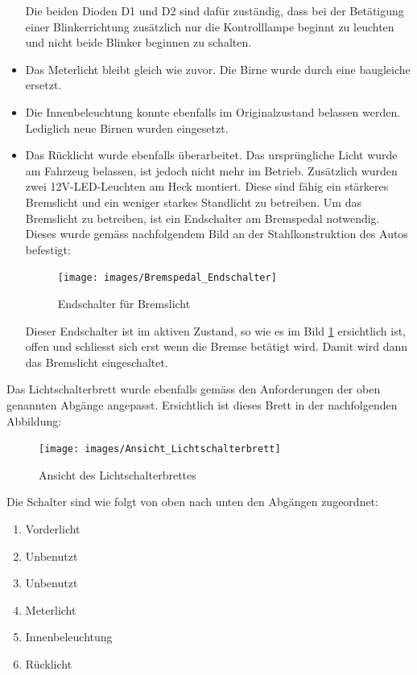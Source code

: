 \begin{itemize}
Die beiden Dioden D1 und D2 sind dafür zuständig, dass bei der Betätigung einer Blinkerrichtung zusätzlich nur die Kontrolllampe beginnt zu leuchten und nicht beide Blinker beginnen zu schalten.
\item Das Meterlicht bleibt gleich wie zuvor. Die Birne wurde durch eine baugleiche ersetzt.
\item Die Innenbeleuchtung konnte ebenfalls im Originalzustand belassen werden. Lediglich neue Birnen wurden eingesetzt.
\newpage
\item Das Rücklicht wurde ebenfalls überarbeitet. Das ursprüngliche Licht wurde am Fahrzeug belassen, ist jedoch nicht mehr im Betrieb. Zusätzlich wurden zwei 12V-LED-Leuchten am Heck montiert. Diese sind fähig ein stärkeres Bremslicht und ein weniger starkes Standlicht zu betreiben. Um das Bremslicht zu betreiben, ist ein Endschalter am Bremspedal notwendig. Dieses wurde gemäss nachfolgendem Bild an der Stahlkonstruktion des Autos befestigt:

\begin{figure}[h!]
	\centering
		\texttt{[image: images/Bremspedal\_Endschalter]}
	\caption{Endschalter für Bremslicht}
	\label{fig:EndschalterBremslicht}
\end{figure}

\newpage

Dieser Endschalter ist im aktiven Zustand, so wie es im Bild \ref{fig:EndschalterBremslicht} ersichtlich ist, offen und schliesst sich erst wenn die Bremse betätigt wird. Damit wird dann das Bremslicht eingeschaltet.

\end{itemize}

\newpage

Das Lichtschalterbrett wurde ebenfalls gemäss den Anforderungen der oben genannten Abgänge angepasst. Ersichtlich ist dieses Brett in der nachfolgenden Abbildung:

\begin{figure}[h!]
	\centering
		\texttt{[image: images/Ansicht\_Lichtschalterbrett]}
	\caption{Ansicht des Lichtschalterbrettes}
	\label{fig:AnsichtLichtschalterbrett}
\end{figure}

Die Schalter sind wie folgt von oben nach unten den Abgängen zugeordnet:

\begin{enumerate}
\item Vorderlicht
\item Unbenutzt
\item Unbenutzt
\item Meterlicht
\item Innenbeleuchtung
\item Rücklicht
\end{enumerate}

\color{black}
\newpage